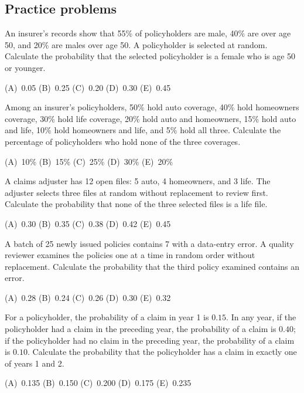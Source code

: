 \subsection{Practice problems}

\begin{practice}
An insurer's records show that 55\% of policyholders are male, 40\% are over age 50, and 20\% are
males over age 50. A policyholder is selected at random.
Calculate the probability that the selected policyholder is a female who is age 50 or younger.
\par\smallskip\noindent (A)~0.05 \quad (B)~0.25 \quad (C)~0.20 \quad (D)~0.30 \quad (E)~0.45
\end{practice}

\begin{practice}
Among an insurer's policyholders, 50\% hold auto coverage, 40\% hold homeowners coverage, 30\%
hold life coverage, 20\% hold auto and homeowners, 15\% hold auto and life, 10\% hold homeowners
and life, and 5\% hold all three.
Calculate the percentage of policyholders who hold none of the three coverages.
\par\smallskip\noindent (A)~10\% \quad (B)~15\% \quad (C)~25\% \quad (D)~30\% \quad (E)~20\%
\end{practice}

\begin{practice}
A claims adjuster has 12 open files: 5 auto, 4 homeowners, and 3 life. The adjuster selects three
files at random without replacement to review first.
Calculate the probability that none of the three selected files is a life file.
\par\smallskip\noindent (A)~0.30 \quad (B)~0.35 \quad (C)~0.38 \quad (D)~0.42 \quad (E)~0.45
\end{practice}

\begin{practice}
A batch of 25 newly issued policies contains 7 with a data-entry error. A quality reviewer examines
the policies one at a time in random order without replacement.
Calculate the probability that the third policy examined contains an error.
\par\smallskip\noindent (A)~0.28 \quad (B)~0.24 \quad (C)~0.26 \quad (D)~0.30 \quad (E)~0.32
\end{practice}

\begin{practice}
For a policyholder, the probability of a claim in year 1 is $0.15$. In any year, if the
policyholder had a claim in the preceding year, the probability of a claim is $0.40$; if the
policyholder had no claim in the preceding year, the probability of a claim is $0.10$.
Calculate the probability that the policyholder has a claim in exactly one of years 1 and 2.
\par\smallskip\noindent (A)~0.135 \quad (B)~0.150 \quad (C)~0.200 \quad (D)~0.175 \quad (E)~0.235
\end{practice}

